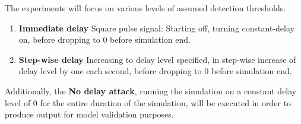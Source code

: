 




The experiments will focus on various levels of assumed detection thresholds.


\begin{enumerate}
    \item \textbf{Immediate delay} Square pulse signal: Starting off, turning constant-delay on,  before dropping to 0 before simulation end. 
    \item \textbf{Step-wise delay} Increasing to delay level specified, in step-wise increase of delay level by one each second, before dropping to 0 before simulation end. 
\end{enumerate}

Additionally, the  \textbf{No delay attack}, running the simulation on a constant delay level of $0$ for the entire duration of the simulation, will be executed in order to produce output for model validation purposes. 








